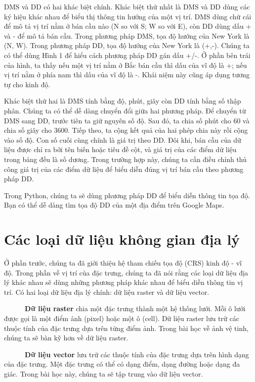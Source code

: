 DMS và DD có hai khác biệt chính. Khác biệt thứ nhất là DMS và DD dùng các ký hiệu khác nhau để biểu thị thông tin hướng của một vị trí. DMS dùng chữ cái để mô tả vị trí nằm ở bán cầu nào (N so với S; W so với E), còn DD dùng dấu + và - để mô tả bán cầu. Trong phương pháp DMS, tọa độ hướng của New York là (N, W). Trong phương pháp DD, tọa độ hướng của New York là (+,-). Chúng ta có thể dùng Hình 1 để hiểu cách phương pháp DD gán dấu +/-. Ở phần bên trái của hình, ta thấy nếu một vị trí nằm ở Bắc bán cầu thì dấu của vĩ độ là +; nếu vị trí nằm ở phía nam thì dấu của vĩ độ là -. Khái niệm này cũng áp dụng tương tự cho kinh độ.

Khác biệt thứ hai là DMS tính bằng độ, phút, giây còn DD tính bằng số thập phân. Chúng ta có thể dễ dàng chuyển đổi giữa hai phương pháp. Để chuyển từ DMS sang DD, trước tiên ta giữ nguyên số độ. Sau đó, ta chia số phút cho 60 và chia số giây cho 3600. Tiếp theo, ta cộng kết quả của hai phép chia này rồi cộng vào số độ. Con số cuối cùng chính là giá trị theo DD. Đôi khi, bán cầu của dữ liệu được chỉ ra bởi tên biến hoặc tiêu đề cột, và giá trị của các điểm dữ liệu trong bảng đều là số dương. Trong trường hợp này, chúng ta cần điều chỉnh thủ công giá trị của các điểm dữ liệu để biểu diễn đúng vị trí bán cầu theo phương pháp DD.

Trong Python, chúng ta sẽ dùng phương pháp DD để biểu diễn thông tin tọa độ. Bạn có thể dễ dàng tìm tọa độ DD của một địa điểm trên Google Maps.

\section{Các loại dữ liệu không gian địa lý}

Ở phần trước, chúng ta đã giới thiệu hệ tham chiếu tọa độ (CRS) kinh độ - vĩ độ. Trong phần về vị trí của đặc trưng, chúng ta đã nói rằng các loại dữ liệu địa lý khác nhau sẽ dùng những phương pháp khác nhau để biểu diễn thông tin vị trí. Có hai loại dữ liệu địa lý chính: dữ liệu raster và dữ liệu vector.

~~~~~~\textbf{Dữ liệu raster} chia một đặc trưng thành một hệ thống lưới. Mỗi ô lưới được gọi là một điểm ảnh (pixel) hoặc một ô (cell). Dữ liệu raster lưu trữ các thuộc tính của đặc trưng dựa trên từng điểm ảnh. Trong bài học về ảnh vệ tinh, chúng ta sẽ bàn kỹ hơn về dữ liệu raster.

~~~~~~\textbf{Dữ liệu vector} lưu trữ các thuộc tính của đặc trưng dựa trên hình dạng của đặc trưng. Một đặc trưng có thể có dạng điểm, dạng đường hoặc dạng đa giác. Trong bài học này, chúng ta sẽ tập trung vào dữ liệu vector.

